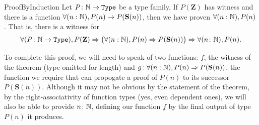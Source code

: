 \documentclass[11pt]{article}
\begin{document}
\begin{label theorem}{ProofByInduction}
Let $P\colon \mathbb{N} \to \mathtt{Type}$ be a type family. If $P(\mathbf{Z})$ has witness and there is a function $\forall (n : \mathbb{N}), P(n) \to P(\mathbf{S}(n))$, then we have proven $\forall (n : \mathbb{N}), P(n)$. That is, there is a witness for \begin{gather*}
\forall (P\colon \mathbb{N} \to \mathtt{Type}), P(\mathbf{Z}) \Rightarrow \big(\forall (n : \mathbb{N}), P(n) \Rightarrow P(\mathbf{S}(n)) \big) \Rightarrow \forall (n \colon \mathbb{N}), P(n).
\end{gather*}
\end{label theorem}
\begin{my proof}
To complete this proof, we will need to speak of two functions: $f$, the witness of the theorem (type omitted for length) and $g\colon \forall (n : \mathbb{N}), P(n) \Rightarrow P(\mathbf{S}(n))$, the function we require that can propogate a proof of $P(n)$ to its successor $P(\mathbf{S}(n))$. Although it may not be obvious by the statement of the theorem, by the right-associativity of function types (yes, even dependent ones), we will also be able to provide $n \colon \mathbb{N}$, defining our function $f$ by the final output of type $P(n)$ it produces.


\end{my proof}
\end{document}
